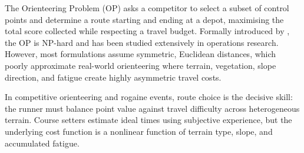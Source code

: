 \documentclass[preprint,11pt]{elsarticle}
\begin{document}
The Orienteering Problem (OP) asks a competitor to select a subset of control points and determine a route starting and ending at a depot, maximising the total score collected while respecting a travel budget.
Formally introduced by \citet{tsiligirides1984heuristic}, the OP is NP-hard and has been studied extensively in operations research.
However, most formulations assume symmetric, Euclidean distances, which poorly approximate real-world orienteering where terrain, vegetation, slope direction, and fatigue create highly asymmetric travel costs.

In competitive orienteering and rogaine events, route choice is the decisive skill: the runner must balance point value against travel difficulty across heterogeneous terrain.
Course setters estimate ideal times using subjective experience, but the underlying cost function is a nonlinear function of terrain type, slope, and accumulated fatigue.
\end{document}
